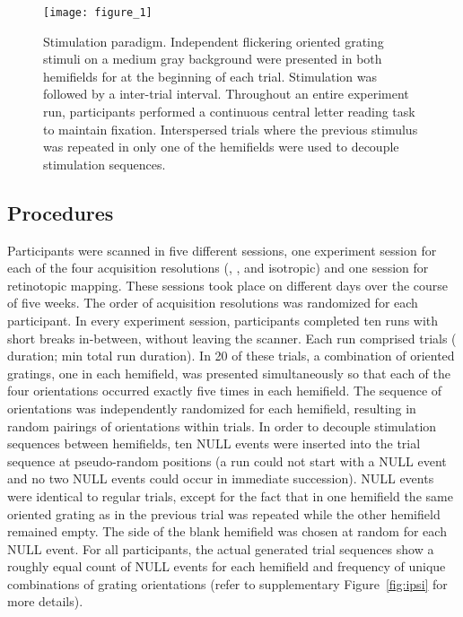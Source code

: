 \begin{figure}
  \centering
  \texttt{[image: figure\_1]}

  \caption{
    Stimulation paradigm. Independent flickering oriented grating stimuli on a
    medium gray background were presented in both hemifields for  at
    the beginning of each trial. Stimulation was followed by a 
    inter-trial interval. Throughout an entire experiment run, participants
    performed a continuous central letter reading task to maintain fixation.
    Interspersed trials where the previous stimulus was repeated in only one of
    the hemifields were used to decouple stimulation sequences.
  }

  \label{fig:exp_design}
\end{figure}

\subsection*{Procedures}

\noindent Participants were scanned in five different sessions, one experiment
session for each of the four acquisition resolutions (, ,
 and  isotropic) and one session for retinotopic mapping. These
sessions took place on different days over the course of five weeks. The order
of acquisition resolutions was randomized for each participant. In every
experiment session, participants completed ten runs with short breaks
in-between, without leaving the scanner. Each run comprised \unit[30]{trials}
( duration; \unit[4]{min} total run duration). In 20 of these
trials, a combination of oriented gratings, one in each hemifield, was presented
simultaneously so that each of the four orientations occurred exactly five
times in each hemifield. The sequence of orientations was independently
randomized for each hemifield, resulting in random pairings of orientations
within trials. In order to decouple stimulation sequences between hemifields,
ten NULL events were inserted into the trial sequence at pseudo-random
positions (a run could not start with a NULL event and no two NULL events
could occur in immediate succession). NULL events were identical to regular
trials, except for the fact that in one hemifield the same oriented grating as
in the previous trial was repeated while the other hemifield remained empty.
The side of the blank hemifield was chosen at random for each NULL event. For
all participants, the actual generated trial sequences show a roughly equal
count of NULL events for each hemifield and frequency of unique combinations of
grating orientations (refer to supplementary Figure~\ref{fig:ipsi} for more details). 

